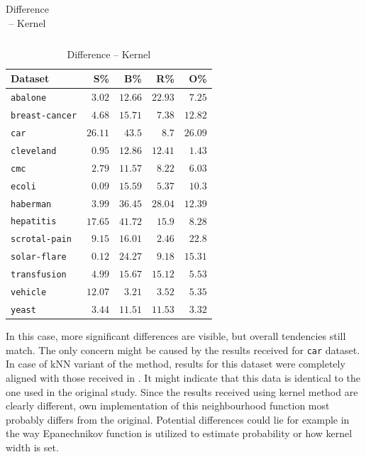 \documentclass[12pt]{article}
\begin{document}
\begin{table}[H]
\begin{minipage}[t]{0.5\textwidth}
\begin{tabular}{lrrrr}
    \bottomrule
\end{tabular}
\caption{Original -- Kernel}
\label{tab:kernel_org}
\end{minipage}
\begin{minipage}[t]{0.5\textwidth}
\centering
\begin{tabular}{lrrrr}
    \toprule
    Dataset & S\% & B\% & R\% & O\% \\ \midrule
    \texttt{abalone} & $3.02$ & $12.66$ & $22.93$ & $7.25$ \\
    \texttt{breast-cancer} & $4.68$ & $15.71$ & $7.38$ & $12.82$ \\
    \texttt{car} & $26.11$ & $43.5$ & $8.7$ & $26.09$ \\
    \texttt{cleveland} & $0.95$ & $12.86$ & $12.41$ & $1.43$ \\
    \texttt{cmc} & $2.79$ & $11.57$ & $8.22$ & $6.03$ \\
    \texttt{ecoli} & $0.09$ & $15.59$ & $5.37$ & $10.3$ \\
    \texttt{haberman} & $3.99$ & $36.45$ & $28.04$ & $12.39$ \\
    \texttt{hepatitis} & $17.65$ & $41.72$ & $15.9$ & $8.28$ \\
    \texttt{scrotal-pain} & $9.15$ & $16.01$ & $2.46$ & $22.8$ \\
    \texttt{solar-flare} & $0.12$ & $24.27$ & $9.18$ & $15.31$ \\
    \texttt{transfusion} & $4.99$ & $15.67$ & $15.12$ & $5.53$ \\
    \texttt{vehicle} & $12.07$ & $3.21$ & $3.52$ & $5.35$ \\
    \texttt{yeast} & $3.44$ & $11.51$ & $11.53$ & $3.32$ \\
    \bottomrule
\end{tabular}
\caption{Difference -- Kernel}
\label{tab:kernel_diff}
\end{minipage}
\end{table}

In this case, more significant differences are visible, but overall tendencies still match. The only concern might be caused by the results received for \texttt{car} dataset. In case of kNN variant of the method, results for this dataset were completely aligned with those received in \cite{Napierala2016}. It might indicate that this data is identical to the one used in the original study. Since the results received using kernel method are clearly different, own implementation of this neighbourhood function most probably differs from the original. Potential differences could lie for example in the way Epanechnikov function is utilized to estimate probability or how kernel width is set.
\end{document}
